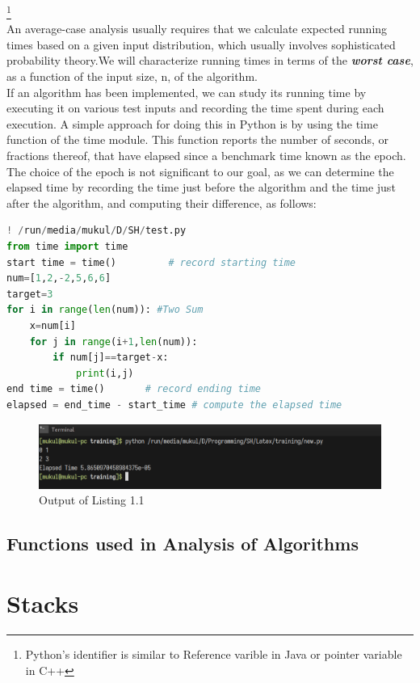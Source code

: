 \documentclass[a4paper,12pt]{report}
\begin{document}
\footnote{Python's identifier is similar to Reference varible in Java or
pointer variable in C++}
\\
An average-case analysis usually requires that we calculate expected running
times based on a given input distribution, which usually involves sophisticated
probability theory.We will characterize running times in terms of the \textit{\textbf{worst
case}}, as a function of the input size, n, of the algorithm.\\
If an algorithm has been implemented, we can study its running time by executing
it on various test inputs and recording the time spent during each execution. A
simple approach for doing this in Python is by using the time function of the time
module. This function reports the number of seconds, or fractions thereof, that have
elapsed since a benchmark time known as the epoch. The choice of the epoch is
not significant to our goal, as we can determine the elapsed time by recording the
time just before the algorithm and the time just after the algorithm, and computing
their difference, as follows:\\
\begin{lstlisting}[language=Python,caption=\textsf{Calculating Run time}]
! /run/media/mukul/D/SH/test.py
from time import time
start time = time()  		# record starting time
num=[1,2,-2,5,6,6]
target=3
for i in range(len(num)): #Two Sum
    x=num[i]
    for j in range(i+1,len(num)):
        if num[j]==target-x:
            print(i,j)
end time = time()		# record ending time
elapsed = end_time - start_time # compute the elapsed time
\end{lstlisting}
\begin{figure}[h]
	\centering
\includegraphics[scale=0.45]{piku.png}
	\caption{Output of Listing 1.1}
\end{figure}
\section{Functions used in Analysis of Algorithms}
\newpage





\chapter{Stacks}
\newpage
\end{document}
